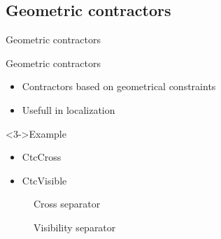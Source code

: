 \documentclass[10pt, xcolor={usenames, dvipsnames}]{beamer}
\begin{document}
        \subsection{Geometric contractors}
            
            \begin{frame}{Geometric contractors}
                \begin{minipage}[t]{.45\textwidth}
                    \begin{block}{Geometric contractors}
                        \vspace{2.5mm}
                        \begin{itemize}
                            \item<1-> Contractors based on geometrical constraints
                            \item<2-> Usefull in localization
                        \end{itemize}
                    \end{block}
                    \begin{exampleblock}<3->{Example}
                        \begin{itemize}[<+->]
                            \item<3-> CtcCross
                            \item<4-> CtcVisible
                        \end{itemize}
                    \end{exampleblock}
                \end{minipage}%
                \hfill
                \begin{minipage}[t]{.5\textwidth}
                    \begin{figure}
                        \begin{overprint}
                            \centerline{}
                            \centerline{}
                        \end{overprint}
                        \vspace{-8mm}
                        \begin{overprint}
                            \caption{Cross separator}
                            \caption{Visibility separator}
                        \end{overprint}
                    \end{figure}
                \end{minipage}
            \end{frame}
\end{document}

